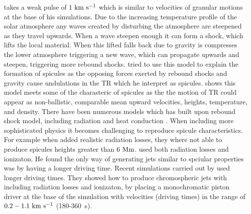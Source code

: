 \documentclass[12pt]{ociamthesis}
\newcommand{\kms}{~\rm{km ~s^{-1}}}
\begin{document}
\cite{Hollweg1982ApJ257345H} takes a weak pulse of $1\kms$ which is similar to velocities of granular motions at the base of his simulations. Due to the increasing temperature profile of the solar atmosphere any waves created by disturbing the atmosphere are steepened as they travel upwards. When a wave steepen enough it can form a shock, which lifts the local material. When this lifted falls back due to gravity is compresses the lower atmosphere triggering a new wave, which can propagate upwards and steepen, triggering more rebound shocks. \cite{Hollweg1982ApJ257345H} tried to use this model to explain the formation of spicules as the opposing forces exerted by rebound shocks and gravity cause undulations in the TR which he interpret as spicules. \cite{Hollweg1982ApJ257345H} shows this model meets some of the charasteric of spicules as the the motion of TR could appear as non-ballistic, comparable mean upward velocities, heights, temperature, and density. There have been numerous models which has built upon rebound shock model, including radiation and heat conduction \citep{Sterling1988ApJ327950S, Sterling1990ApJ349647S, Cheng1992AA266549C, Cheng1992AA262581C, Cheng1992AA266537C}. When including more sophisticated physics it becomes challenging to reproduce spicule characteristics. For example when \cite{Sterling1990ApJ349647S} added realistic radiation losses, they where not able to produce spicules heights greater than $6~\rm{Mm}$. \cite{Cheng1992AA266549C, Cheng1992AA266537C} used both radiation losses and ionizaton. He found the only way of generating jets similar to spciular properties was by having a longer driving time. Recent simulations carried out by \cite{Heggland2007ApJ6661277H} used longer driving times. They showed how to produce chromospheric jets with including radiation losses and ionizaton, by placing a monochromatic piston driver at the base of the simulation with velocities (driving times) in the range of $0.2-1.1\kms$ (180-360~\rm{s}).
%
\end{document}
